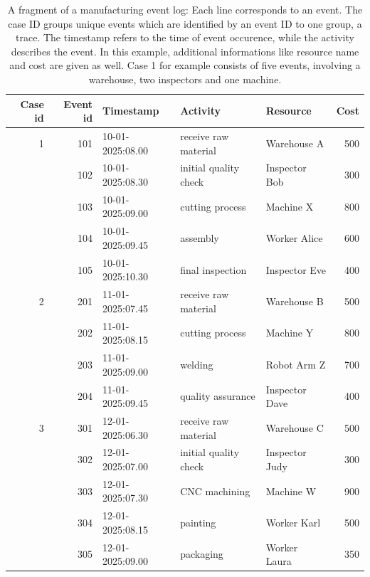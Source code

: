 \begin{table}[htbp]
  \centering
  \caption{A fragment of a manufacturing event log: Each line corresponds to an event. The case ID groups unique events which are identified by an event ID to one group, a trace. The timestamp refers to the time of event occurence, while the activity describes the event. In this example, additional informations like resource name and cost are given as well. Case 1 for example consists of five events, involving a warehouse, two inspectors and one machine.}
  \label{tab:manufacturinglog}
  \begin{tabular}{r r l l l r}
    \toprule
    \textbf{Case id} & \textbf{Event id} & \textbf{Timestamp} & \textbf{Activity}     & \textbf{Resource} & \textbf{Cost} \\
    \midrule
    1                & 101               & 10-01-2025:08.00   & receive raw material  & Warehouse A       & 500           \\
                     & 102               & 10-01-2025:08.30   & initial quality check & Inspector Bob     & 300           \\
                     & 103               & 10-01-2025:09.00   & cutting process       & Machine X         & 800           \\
                     & 104               & 10-01-2025:09.45   & assembly              & Worker Alice      & 600           \\
                     & 105               & 10-01-2025:10.30   & final inspection      & Inspector Eve     & 400           \\
    \midrule
    2                & 201               & 11-01-2025:07.45   & receive raw material  & Warehouse B       & 500           \\
                     & 202               & 11-01-2025:08.15   & cutting process       & Machine Y         & 800           \\
                     & 203               & 11-01-2025:09.00   & welding               & Robot Arm Z       & 700           \\
                     & 204               & 11-01-2025:09.45   & quality assurance     & Inspector Dave    & 400           \\
    \midrule
    3                & 301               & 12-01-2025:06.30   & receive raw material  & Warehouse C       & 500           \\
                     & 302               & 12-01-2025:07.00   & initial quality check & Inspector Judy    & 300           \\
                     & 303               & 12-01-2025:07.30   & CNC machining         & Machine W         & 900           \\
                     & 304               & 12-01-2025:08.15   & painting              & Worker Karl       & 500           \\
                     & 305               & 12-01-2025:09.00   & packaging             & Worker Laura      & 350           \\
    \bottomrule
  \end{tabular}
\end{table}

